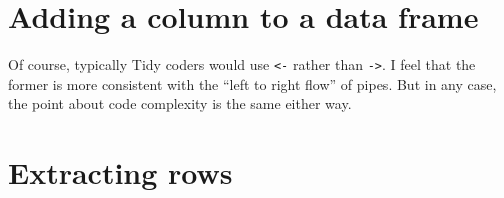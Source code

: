 \documentclass[11pt]{article}
\begin{document}
\section*{Adding a column to a data frame}

\begin{parcolumns}[rulebetween=true]{2}


\hspace{0.1in}


\end{parcolumns}

\bigskip

Of course, typically Tidy coders would use \lstinline{<-}
rather than \lstinline{->}.  I feel that the former is more
consistent with the ``left to right flow'' of pipes.  But in any case,
the point about code complexity is the same either way.

\section*{Extracting rows}
\end{document}
